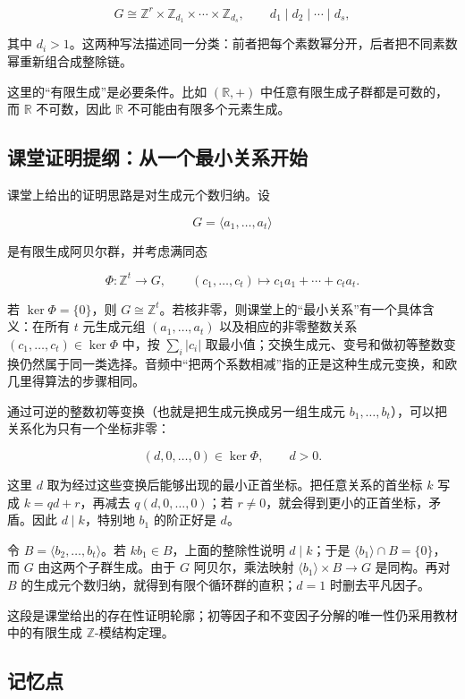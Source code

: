 \[
G\cong \mathbb Z^r\times\mathbb Z_{d_1}\times\cdots\times\mathbb Z_{d_s},
\qquad d_1\mid d_2\mid\cdots\mid d_s,
\]

其中 $d_i>1$。这两种写法描述同一分类：前者把每个素数幂分开，后者把不同素数幂重新组合成整除链。

这里的“有限生成”是必要条件。比如 $(\mathbb R,+)$ 中任意有限生成子群都是可数的，而 $\mathbb R$ 不可数，因此 $\mathbb R$ 不可能由有限多个元素生成。

\subsection{课堂证明提纲：从一个最小关系开始}


课堂上给出的证明思路是对生成元个数归纳。设

\[
G=\langle a_1,\ldots,a_t\rangle
\]

是有限生成阿贝尔群，并考虑满同态

\[
\Phi:\mathbb Z^t\longrightarrow G,
\qquad (c_1,\ldots,c_t)\longmapsto c_1a_1+\cdots+c_ta_t.
\]

若 $\ker\Phi=\{0\}$，则 $G\cong\mathbb Z^t$。若核非零，则课堂上的“最小关系”有一个具体含义：在所有 $t$ 元生成元组 $(a_1,\ldots,a_t)$ 以及相应的非零整数关系 $(c_1,\ldots,c_t)\in\ker\Phi$ 中，按 $\sum_i|c_i|$ 取最小值；交换生成元、变号和做初等整数变换仍然属于同一类选择。音频中“把两个系数相减”指的正是这种生成元变换，和欧几里得算法的步骤相同。

通过可逆的整数初等变换（也就是把生成元换成另一组生成元 $b_1,\ldots,b_t$），可以把关系化为只有一个坐标非零：

\[
(d,0,\ldots,0)\in\ker\Phi,\qquad d>0.
\]

这里 $d$ 取为经过这些变换后能够出现的最小正首坐标。把任意关系的首坐标 $k$ 写成 $k=qd+r$，再减去 $q(d,0,\ldots,0)$；若 $r\ne0$，就会得到更小的正首坐标，矛盾。因此 $d\mid k$，特别地 $b_1$ 的阶正好是 $d$。

令 $B=\langle b_2,\ldots,b_t\rangle$。若 $k b_1\in B$，上面的整除性说明 $d\mid k$；于是 $\langle b_1\rangle\cap B=\{0\}$，而 $G$ 由这两个子群生成。由于 $G$ 阿贝尔，乘法映射 $\langle b_1\rangle\times B\to G$ 是同构。再对 $B$ 的生成元个数归纳，就得到有限个循环群的直积；$d=1$ 时删去平凡因子。

这段是课堂给出的存在性证明轮廓；初等因子和不变因子分解的唯一性仍采用教材中的有限生成 $\mathbb Z$-模结构定理。

\subsection{记忆点}


